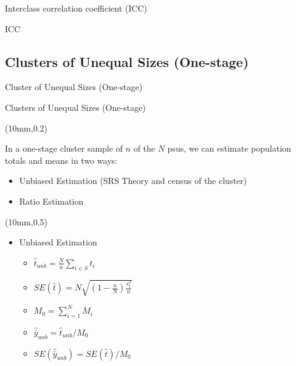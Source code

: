\documentclass[10pt]{beamer}\usepackage[]{graphicx}\usepackage[]{xcolor}
\begin{document}
\begin{frame}{Interclass correlation coefficient (ICC)}
\begin{block}{ICC}
{}
\end{block}
\end{frame}



\subsection{Clusters of Unequal Sizes (One-stage)}

\begin{frame}{}
\begin{block}{}
\begin{center}
Cluster of Unequal Sizes (One-stage)
\end{center}
\end{block}
\end{frame}


\begin{frame}{Clusters of Unequal Sizes (One-stage)}

\begin{textblock*}{100mm}(10mm,0.2\textheight)
\begin{block}{}
In a one-stage cluster sample of $n$ of the $N$ psus, we can estimate population totals and means in two ways:
\begin{itemize}
\item Unbiased Estimation (SRS Theory and census of the cluster)
\item Ratio Estimation
\end{itemize}
\end{block}
\end{textblock*}

\begin{textblock*}{50mm}(10mm,0.5\textheight)
\begin{block}{}
\begin{itemize}
\item Unbiased Estimation
\begin{itemize}
\item $\hat{t}_{unb}=\frac{N}{n} \sum_{i\in S} t_i$
\item $SE(\hat{t}) =N\sqrt{\left(1-\frac{n}{N}\right)\frac{s_t^2}{n}}$
\item $M_0=\sum_{i=1}^N M_i$
\item $\hat{\bar{y}}_{unb} = \hat{t}_{unb}/M_0$
\item $SE(\hat{\bar{y}}_{unb})=SE(\hat{t})/M_0$
\end{itemize}
\end{itemize}
\end{block}
\end{textblock*}



\end{frame}
\end{document}
